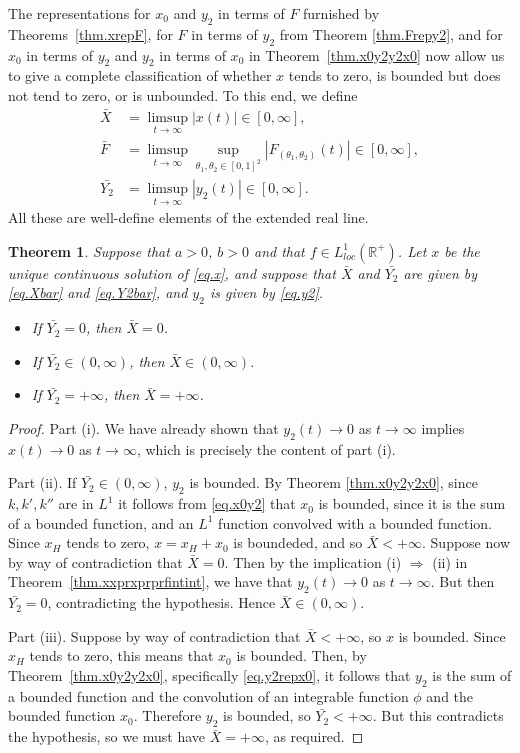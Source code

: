 \documentclass[10pt,reqno]{amsart}
\newtheorem{theorem}{Theorem}
\theoremstyle{definition}
\begin{document}
	The representations for $x_0$ and $y_2$ in terms of $F$ furnished by Theorems~\ref{thm.xrepF}, for $F$ in terms of $y_2$ from Theorem \ref{thm.Frepy2}, and for $x_0$ in terms of $y_2$ and $y_2$ in terms of $x_0$ in Theorem~\ref{thm.x0y2y2x0} now allow us to give a complete classification of whether $x$ tends to zero, is bounded but does not tend to zero, or is unbounded. 
	To this end, we define
	\begin{align} \label{eq.Xbar}
		\bar{X}&=\limsup_{t\to\infty} |x(t)|\in [0,\infty],\\
		 \label{eq.Fbar}
		\bar{F}&=\limsup_{t\to\infty} \sup_{\theta_1,\theta_2\in [0,1]^2} |F_{(\theta_1,\theta_2)}(t)|\in [0,\infty],\\
		\label{eq.Y2bar}
		\bar{Y_2}&=\limsup_{t\to\infty} |y_2(t)|\in [0,\infty].
	\end{align}
	All these are well-define elements of the extended real line. 
	\begin{theorem}
		Suppose that $a>0$, $b>0$ and that $f\in L^1_{loc}(\mathbb{R}^+)$. Let $x$ be the unique continuous solution of \eqref{eq.x}, and suppose that $\bar{X}$ and $\bar{Y_2}$ are given by \eqref{eq.Xbar} and \eqref{eq.Y2bar}, and $y_2$ is given by \eqref{eq.y2}.
		\begin{itemize}
			\item[(i)] If $\bar{Y_2}=0$, then $\bar{X}=0$.
			\item[(ii)] If $\bar{Y_2}\in (0,\infty)$, then $\bar{X}\in (0,\infty)$.
			\item[(iii)] If $\bar{Y_2}=+\infty$, then  $\bar{X}=+\infty$.
		\end{itemize}
	\end{theorem}
	\begin{proof}
		Part (i). We have already shown that  $y_2(t)\to 0$ as $t\to\infty$ implies $x(t)\to 0$ as $t\to\infty$, which is precisely the content of part (i). 
		
		Part (ii). If $\bar{Y_2}\in (0,\infty)$, $y_2$ is bounded. By Theorem \ref{thm.x0y2y2x0}, since $k, k', k''$ are in $L^1$ it follows from  \eqref{eq.x0y2} that $x_0$ is  bounded, since it is the sum of a bounded function, and an $L^1$ function convolved with a bounded function. Since $x_H$ tends to zero, $x=x_H+x_0$ is boundeded, and so $\bar{X}<+\infty$. Suppose now by way of contradiction that $\bar{X}=0$. Then by the implication (i) $\Rightarrow$ (ii) in Theorem~\ref{thm.xxprxprprfintint}, we have that $y_2(t)\to 0$ as $t\to\infty$. But then $\bar{Y_2}=0$, contradicting the hypothesis. Hence $\bar{X}\in (0,\infty)$.
		
		Part (iii). Suppose by way of contradiction that $\bar{X}<+\infty$, so $x$ is bounded. Since $x_H$ tends to zero, this means that $x_0$ is bounded. Then, by Theorem~\ref{thm.x0y2y2x0}, specifically \eqref{eq.y2repx0}, it follows that $y_2$ is the sum of a bounded function and the convolution of an integrable function $\phi$ and the bounded function $x_0$. Therefore $y_2$ is bounded, so $\bar{Y_2}<+\infty$. But this contradicts the hypothesis, so we must have $\bar{X}=+\infty$, as required.
	\end{proof}
	
\end{document}
